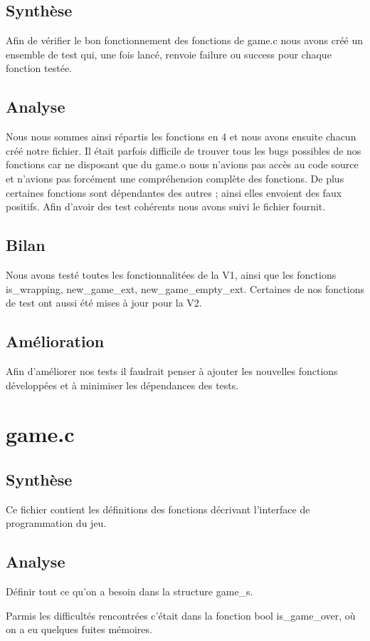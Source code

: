 \documentclass[12pt]{article}
\begin{document}
\subsection{Synthèse}
Afin de vérifier le bon fonctionnement des fonctions de game.c nous avons créé un ensemble de test qui, une fois lancé, renvoie failure ou success 
pour chaque fonction testée.
\subsection{Analyse}
Nous nous sommes ainsi répartis les fonctions en 4 et nous avons ensuite chacun créé notre fichier.
Il était parfois difficile de trouver tous les bugs possibles de nos fonctions car ne disposant que du game.o
nous n'avions pas accès au code source et n'avions pas forcément une compréhension complète des fonctions. 
De plus certaines fonctions sont dépendantes des autres ; ainsi elles envoient des faux positifs.
Afin d'avoir des test cohérents nous avons suivi le fichier fournit.
\subsection{Bilan}
Nous avons testé toutes les fonctionnalitées de la V1, ainsi que les fonctions is\_wrapping, new\_game\_ext, new\_game\_empty\_ext.
Certaines de nos fonctions de test ont aussi été mises à jour pour la V2.
\subsection{Amélioration}
Afin d'améliorer nos tests il faudrait penser à ajouter les nouvelles fonctions développées et à minimiser les dépendances des tests.



\section{game.c}
\subsection{Synthèse}
Ce fichier contient les définitions des fonctions décrivant l'interface de programmation du jeu.
\subsection{Analyse}
Définir tout ce qu'on a besoin dans la structure game\_s.

Parmis les difficultés rencontrées c'était dans la fonction bool is\_game\_over, où on a eu quelques fuites mémoires.
\end{document}
